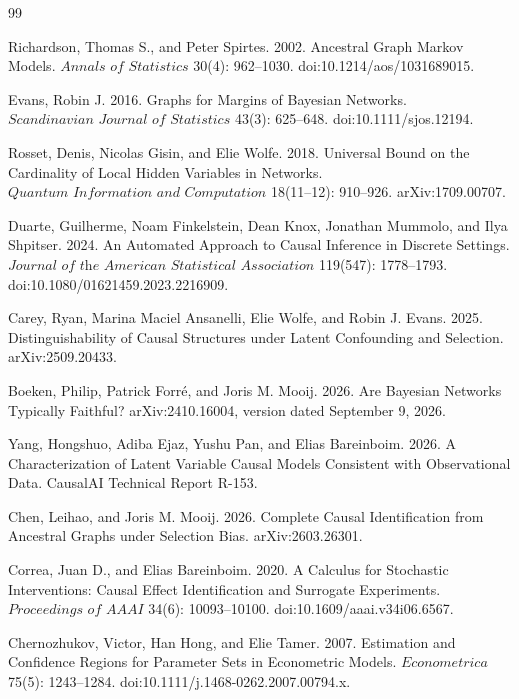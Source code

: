 \documentclass{article}
\begin{document}
\begin{thebibliography}{99}

   Richardson, Thomas S., and Peter Spirtes. 2002. Ancestral Graph Markov Models. \(\textit{Annals of Statistics}\) 30(4): 962--1030. doi:10.1214/aos/1031689015.

   Evans, Robin J. 2016. Graphs for Margins of Bayesian Networks. \(\textit{Scandinavian Journal of Statistics}\) 43(3): 625--648. doi:10.1111/sjos.12194.

   Rosset, Denis, Nicolas Gisin, and Elie Wolfe. 2018. Universal Bound on the Cardinality of Local Hidden Variables in Networks. \(\textit{Quantum Information and Computation}\) 18(11--12): 910--926. arXiv:1709.00707.

   Duarte, Guilherme, Noam Finkelstein, Dean Knox, Jonathan Mummolo, and Ilya Shpitser. 2024. An Automated Approach to Causal Inference in Discrete Settings. \(\textit{Journal of the American Statistical Association}\) 119(547): 1778--1793. doi:10.1080/01621459.2023.2216909.

   Carey, Ryan, Marina Maciel Ansanelli, Elie Wolfe, and Robin J. Evans. 2025. Distinguishability of Causal Structures under Latent Confounding and Selection. arXiv:2509.20433.

   Boeken, Philip, Patrick Forré, and Joris M. Mooij. 2026. Are Bayesian Networks Typically Faithful? arXiv:2410.16004, version dated September 9, 2026.

   Yang, Hongshuo, Adiba Ejaz, Yushu Pan, and Elias Bareinboim. 2026. A Characterization of Latent Variable Causal Models Consistent with Observational Data. CausalAI Technical Report R-153.

   Chen, Leihao, and Joris M. Mooij. 2026. Complete Causal Identification from Ancestral Graphs under Selection Bias. arXiv:2603.26301.

   Correa, Juan D., and Elias Bareinboim. 2020. A Calculus for Stochastic Interventions: Causal Effect Identification and Surrogate Experiments. \(\textit{Proceedings of AAAI}\) 34(6): 10093--10100. doi:10.1609/aaai.v34i06.6567.

   Chernozhukov, Victor, Han Hong, and Elie Tamer. 2007. Estimation and Confidence Regions for Parameter Sets in Econometric Models. \(\textit{Econometrica}\) 75(5): 1243--1284. doi:10.1111/j.1468-0262.2007.00794.x.


\end{thebibliography}
\end{document}
